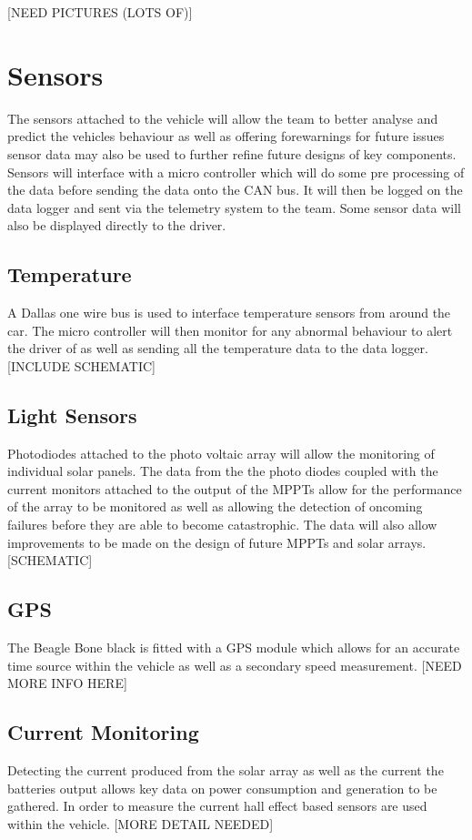\documentclass[10pt,a4paper]{article}
\begin{document}
[NEED PICTURES (LOTS OF)]

\section{Sensors}
The sensors attached to the vehicle will allow the team to better analyse and predict the vehicles behaviour as well as offering forewarnings for future issues sensor data may also be used to further refine future designs of key components. Sensors will interface with a micro controller which will do some pre processing of the data before sending the data onto the CAN bus. It will then be logged on the data logger and sent via the telemetry system to the team. Some sensor data will also be displayed directly to the driver. 

\subsection{Temperature}
A Dallas one wire bus is used to interface temperature sensors from around the car. The micro controller will then monitor for any abnormal behaviour to alert the driver of as well as sending all the temperature data to the data logger. [INCLUDE SCHEMATIC]

\subsection{Light Sensors}
Photodiodes attached to the photo voltaic array will allow the monitoring of individual solar panels. The data from the the photo diodes coupled with the current monitors attached to the output of the MPPTs allow for the performance of the array to be monitored as well as allowing the detection of oncoming failures before they are able to become catastrophic. The data will also allow improvements to be made on the design of future MPPTs and solar arrays. [SCHEMATIC] 

\subsection{GPS}
The Beagle Bone black is fitted with a GPS module which allows for an accurate time source within the vehicle as well as a secondary speed measurement. [NEED MORE INFO HERE]

\subsection{Current Monitoring}
Detecting the current produced from the solar array as well as the current the batteries output allows key data on power consumption and generation to be gathered. In order to measure the current hall effect based sensors are used within the vehicle. [MORE DETAIL NEEDED]
\end{document}
